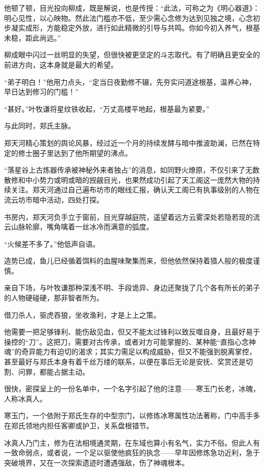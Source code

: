 他顿了顿，目光投向柳成，既是解说，也是传授：“此法，可称之为《明心器道》：明心见性，以心映物。然此法门槛亦不低，至少需心念修为达到见独之境，心念初步凝实成形，方能稳定外放，进行如此精微的引导与共鸣。你如今初入养气，根基未稳，距此尚远。”

柳成眼中闪过一丝明显的失望，但很快被更坚定的斗志取代。有了明确且更安全的前进方向，这本身就是最大的希望。

“弟子明白！”他用力点头，“定当日夜勤修不辍，先夯实问道途根基，温养心神，早日达到修习的门槛！”

“甚好。”叶牧谦将星纹铁收起，“万丈高楼平地起，根基最为紧要。”

\vspace{2em}

与此同时，郑氏主脉。

郑天河精心策划的舆论风暴，经过近一个月的持续发酵与暗中推波助澜，已然在特定的修士圈子里达到了他所期望的沸点。

“落星谷上古炼器传承被神秘外来者独占”的消息，如同野火燎原，不仅引来了无数散修和中小势力或明或暗的觊觎目光，也果然成功引起了天工阁这一庞然大物的持续关注。郑天河通过自己遍布坊市的眼线汇报，确认天工阁已有执事级别的人物在流云坊市暗中活动，四处打探。

书房内，郑天河负手立于窗前，目光穿越庭院，遥望着远方云雾深处若隐若现的流云山脉轮廓，嘴角噙着一丝冰冷而满意的弧度。

“火候差不多了。”他低声自语。

造势已成，鱼儿已经循着饵料的血腥味聚集而来，但他依然保持着猎人般的极度谨慎。

亲自下场，与叶牧谦那种深浅不明、手段诡异、身边还聚拢了几个各有所长的弟子的人物硬碰硬，那非智者所为。

借刀杀人，驱虎吞狼，坐收渔利，才是上上之策。

他需要一把足够锋利、能伤敌见血，但又不能太过锋利以致反噬自身，且最好易于操控的“刀”。这把刀，需要对古传承，或者对方可能掌握的、某种能“直指心念神魂”的奇异能力有迫切的渴求；其实力需足以构成威胁，但又不能强到脱离掌控，甚至最好与郑氏本身有着千丝万缕的联系，以便在事后无论是安抚、奖赏还是切割、问罪，都能占据主动。

很快，密探呈上的一份名单中，一个名字引起了他的注意——寒玉门长老，冰魄，人称冰真人。

寒玉门，一个依附于郑氏生存的中型宗门，以修炼冰寒属性功法著称，门中高手多在郑氏领地内担任客卿或护卫，关系盘根错节。

冰真人乃门主，修为在法相境通灵期，在东域也算小有名气，实力不俗。但此人有一致命弱点，或者说，一个足以驱使他疯狂的执念——早年因修炼急功近利，急于突破境界，又在一次探索遗迹时遭遇强敌，伤了神魂根本。

